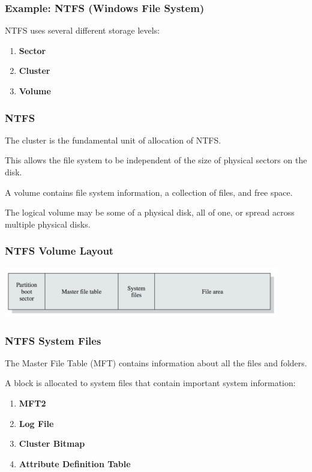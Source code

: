 \begin{frame}
\frametitle{Example: NTFS (Windows File System)}

NTFS uses several different storage levels:

\begin{enumerate}
	\item \textbf{Sector}
	\item \textbf{Cluster}
	\item \textbf{Volume}
\end{enumerate}


\end{frame}

\begin{frame}
\frametitle{NTFS}

The cluster is the fundamental unit of allocation of NTFS.

This allows the file system to be independent of the size of physical sectors on the disk. 

A volume contains file system information, a collection of files, and free space. 

The logical volume may be some of a physical disk, all of one, or spread across multiple physical disks.

\end{frame}

\begin{frame}
\frametitle{NTFS Volume Layout}

\begin{center}
	\includegraphics[width=0.9\textwidth]{images/ntfs-volume.png}
\end{center}

\end{frame}

\begin{frame}
\frametitle{NTFS System Files}

The Master File Table (MFT) contains information about all the files and folders. 

A block is allocated to system files that contain important system information:

\begin{enumerate}
	\item \textbf{MFT2}
	\item \textbf{Log File}
	\item \textbf{Cluster Bitmap}
	\item \textbf{Attribute Definition Table}
\end{enumerate}
\end{frame}



